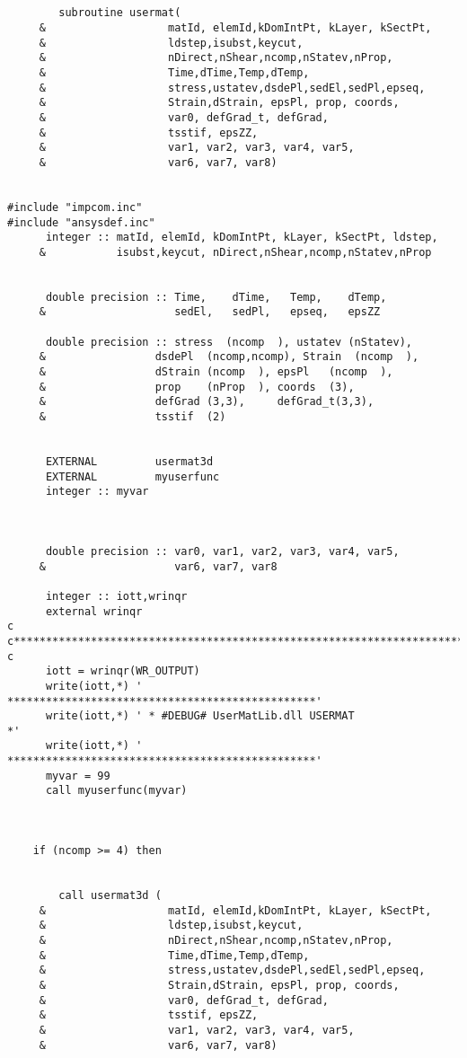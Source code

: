 \begin{lstlisting}

  
        subroutine usermat(
     &                   matId, elemId,kDomIntPt, kLayer, kSectPt,
     &                   ldstep,isubst,keycut,
     &                   nDirect,nShear,ncomp,nStatev,nProp,
     &                   Time,dTime,Temp,dTemp,
     &                   stress,ustatev,dsdePl,sedEl,sedPl,epseq,
     &                   Strain,dStrain, epsPl, prop, coords, 
     &                   var0, defGrad_t, defGrad,
     &                   tsstif, epsZZ,
     &                   var1, var2, var3, var4, var5,
     &                   var6, var7, var8)
	
	
#include "impcom.inc"
#include "ansysdef.inc"
      integer :: matId, elemId, kDomIntPt, kLayer, kSectPt, ldstep,
     &           isubst,keycut, nDirect,nShear,ncomp,nStatev,nProp


      double precision :: Time,    dTime,   Temp,    dTemp,
     &                    sedEl,   sedPl,   epseq,   epsZZ
                  
      double precision :: stress  (ncomp  ), ustatev (nStatev), 
     &                 dsdePl  (ncomp,ncomp), Strain  (ncomp  ), 
     &                 dStrain (ncomp  ), epsPl   (ncomp  ),
     &                 prop    (nProp  ), coords  (3), 
     &                 defGrad (3,3),     defGrad_t(3,3),  
     &                 tsstif  (2) 
	
	
      EXTERNAL         usermat3d
      EXTERNAL         myuserfunc
      integer :: myvar
	
	
	
      double precision :: var0, var1, var2, var3, var4, var5,
     &                    var6, var7, var8

      integer :: iott,wrinqr
      external wrinqr
c
c*************************************************************************
c
      iott = wrinqr(WR_OUTPUT)
      write(iott,*) ' ************************************************'
      write(iott,*) ' * #DEBUG# UserMatLib.dll USERMAT               *'
      write(iott,*) ' ************************************************'
      myvar = 99
      call myuserfunc(myvar)
	
	

	if (ncomp >= 4) then
	
		
		call usermat3d (
     &                   matId, elemId,kDomIntPt, kLayer, kSectPt,
     &                   ldstep,isubst,keycut,
     &                   nDirect,nShear,ncomp,nStatev,nProp,
     &                   Time,dTime,Temp,dTemp,
     &                   stress,ustatev,dsdePl,sedEl,sedPl,epseq,
     &                   Strain,dStrain, epsPl, prop, coords,
     &                   var0, defGrad_t, defGrad,
     &                   tsstif, epsZZ,
     &                   var1, var2, var3, var4, var5,
     &                   var6, var7, var8)



\end{lstlisting}
